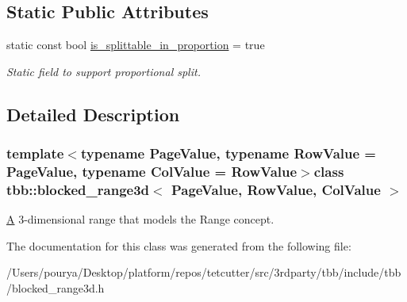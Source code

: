\subsection*{Static Public Attributes}
\begin{DoxyCompactItemize}
\item 
\hypertarget{classtbb_1_1blocked__range3d_a5940c1bd6ba0e8184ef83dea0ae56884}{}static const bool \hyperlink{classtbb_1_1blocked__range3d_a5940c1bd6ba0e8184ef83dea0ae56884}{is\+\_\+splittable\+\_\+in\+\_\+proportion} = true\label{classtbb_1_1blocked__range3d_a5940c1bd6ba0e8184ef83dea0ae56884}

\begin{DoxyCompactList}\small\item\em Static field to support proportional split. \end{DoxyCompactList}\end{DoxyCompactItemize}


\subsection{Detailed Description}
\subsubsection*{template$<$typename Page\+Value, typename Row\+Value = Page\+Value, typename Col\+Value = Row\+Value$>$class tbb\+::blocked\+\_\+range3d$<$ Page\+Value, Row\+Value, Col\+Value $>$}

\hyperlink{structA}{A} 3-\/dimensional range that models the Range concept. 



The documentation for this class was generated from the following file\+:\begin{DoxyCompactItemize}
\item 
/\+Users/pourya/\+Desktop/platform/repos/tetcutter/src/3rdparty/tbb/include/tbb/blocked\+\_\+range3d.\+h\end{DoxyCompactItemize}
